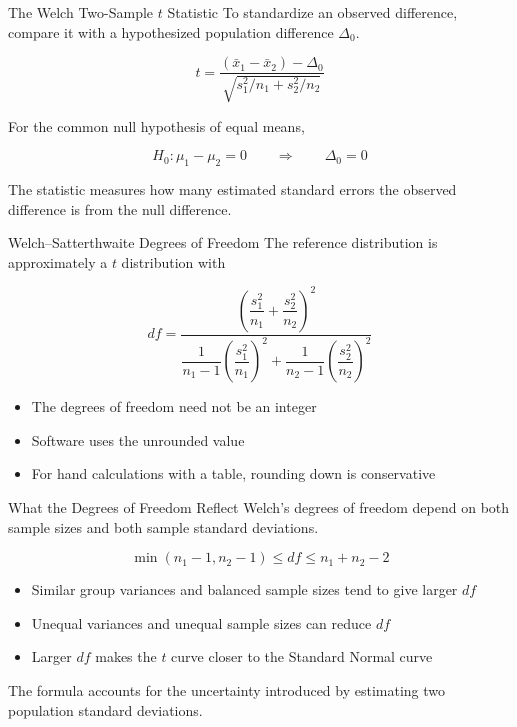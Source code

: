\documentclass[aspectratio=169,10pt]{beamer}
\begin{document}
\begin{frame}{The Welch Two-Sample $t$ Statistic}
To standardize an observed difference, compare it with a hypothesized population difference $\Delta_0$.

\[
t=
\frac{(\bar{x}_1-\bar{x}_2)-\Delta_0}
{\sqrt{s_1^2/n_1+s_2^2/n_2}}
\]

For the common null hypothesis of equal means,

\[
H_0:\mu_1-\mu_2=0
\qquad\Rightarrow\qquad
\Delta_0=0
\]

The statistic measures how many estimated standard errors the observed difference is from the null difference.
\end{frame}

\begin{frame}{Welch--Satterthwaite Degrees of Freedom}
The reference distribution is approximately a $t$ distribution with

\small
\[
df=
\frac{\left(\dfrac{s_1^2}{n_1}+\dfrac{s_2^2}{n_2}\right)^2}
{\dfrac{1}{n_1-1}\left(\dfrac{s_1^2}{n_1}\right)^2+
 \dfrac{1}{n_2-1}\left(\dfrac{s_2^2}{n_2}\right)^2}
\]
\normalsize

\begin{itemize}
  \item The degrees of freedom need not be an integer
  \item Software uses the unrounded value
  \item For hand calculations with a table, rounding down is conservative
\end{itemize}
\end{frame}

\begin{frame}{What the Degrees of Freedom Reflect}
Welch's degrees of freedom depend on both sample sizes and both sample standard deviations.

\[
\min(n_1-1,n_2-1)\le df\le n_1+n_2-2
\]

\begin{itemize}
  \item Similar group variances and balanced sample sizes tend to give larger $df$
  \item Unequal variances and unequal sample sizes can reduce $df$
  \item Larger $df$ makes the $t$ curve closer to the Standard Normal curve
\end{itemize}

The formula accounts for the uncertainty introduced by estimating two population standard deviations.
\end{frame}
\end{document}
